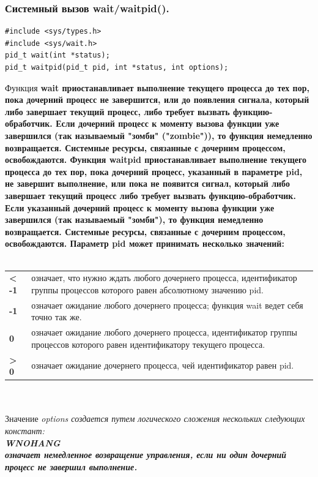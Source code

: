 \documentclass[a4paper]{article}
\begin{document}
\subsubsection{\Large Системный вызов wait/waitpid().}
\begin{verbatim}
#include <sys/types.h>
#include <sys/wait.h>
pid_t wait(int *status);
pid_t waitpid(pid_t pid, int *status, int options);
\end{verbatim}
\rm Функция \bf wait \rm приостанавливает выполнение текущего процесса до тех пор, пока дочерний процесс не завершится, или до появления сигнала, который либо завершает текущий процесс, либо требует вызвать функцию- обработчик. Если дочерний процесс к моменту вызова функции уже завершился (так называемый "зомби" ("zombie")), то функция немедленно возвращается. Системные ресурсы, связанные с дочерним процессом, освобождаются. Функция \bf waitpid \rm приостанавливает выполнение текущего процесса до тех пор, пока дочерний процесс, указанный в параметре pid, не завершит выполнение, или пока не появится сигнал, который либо завершает текущий процесс либо требует вызвать функцию-обработчик. Если указанный дочерний процесс к моменту вызова функции уже завершился (так называемый "зомби"), то функция немедленно возвращается. Системные ресурсы, связанные с дочерним процессом, освобождаются. Параметр pid может принимать несколько значений:\\\\
\begin{tabular}{p{2cm}p{13cm}}
\bf < -1 & \rm означает, что нужно ждать любого дочернего процесса, идентификатор группы процессов которого равен абсолютному значению pid.\\
\bf -1 & \rm означает ожидание любого дочернего процесса; функция wait ведет себя точно так же.\\
\bf 0 & \rm означает ожидание любого дочернего процесса, идентификатор группы процессов которого равен идентификатору текущего процесса.\\
\bf > 0 & \rm означает ожидание дочернего процесса, чей идентификатор равен pid.\\
\end{tabular}
\\\\
Значение \sl options \rm создается путем логического сложения нескольких следующих констант:\\
\bf WNOHANG\\
\rm означает немедленное возвращение управления, если ни один дочерний процесс не завершил выполнение.\\\\
\end{document}
